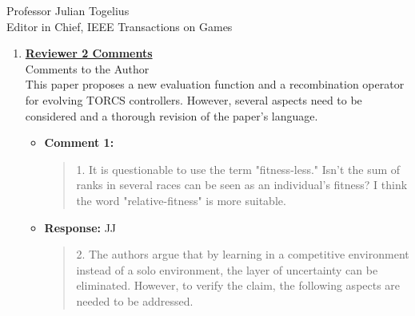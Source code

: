 \documentclass[10pt]{letter} %
\begin{document}
\begin{letter}{Professor Julian Togelius \\ Editor in Chief, IEEE Transactions on Games}
\begin{enumerate}
	I didn't have much to comment on the previous version, but I am glad that the other reviewers had so many comments which have been addressed in this version. My remaining remarks all consider the presentation and are listed below:
\begin{itemize}
	\item {\bf Comment 1:}
	\begin{quote}	
	- Figure 4: the figure is still stretched in the x axis. Comparing it to the figure provided via the link in the authors comments, show that the original image has not been stretched.\\
	- Figure 5: labels are not readable and the image is very stretched in the x-axis\\
	- Table 3: the right border in the second row is missing\\
	- Table 4: the right border is missing in the header of the table
	\end{quote}	
	\item {\bf Response:} 
		We thank the reviewer for his interesting remarks. Figure 4 and Figure.5 have been redrawn and the problem of missing lines of Tables 3 and 4 is fixed. 	
		
\end{itemize}

We are very grateful to this reviewer for his/her useful and kind comments.

\newpage


\item {\bf \underline{ Reviewer 2 Comments}}\\
	Comments to the Author\\
This paper proposes a new evaluation function and a recombination operator for evolving TORCS controllers. However, several aspects need to be considered and a thorough revision of the paper's language.

	\begin{itemize}			

		\item {\bf Comment 1:}
		\begin{quote}

1. It is questionable to use the term "fitness-less." Isn't the sum of ranks in several races can be seen as an individual's fitness? I think the word "relative-fitness" is more suitable.
		\end{quote}	
		\item {\bf Response:} 
		JJ
		\begin{quote}
2. The authors argue that by learning in a competitive environment instead of a solo environment, the layer of uncertainty can be eliminated. However, to verify the claim, the following aspects are needed to be addressed.
		\end{quote}	


\end{itemize}
\end{enumerate}
\end{letter}
\end{document}
